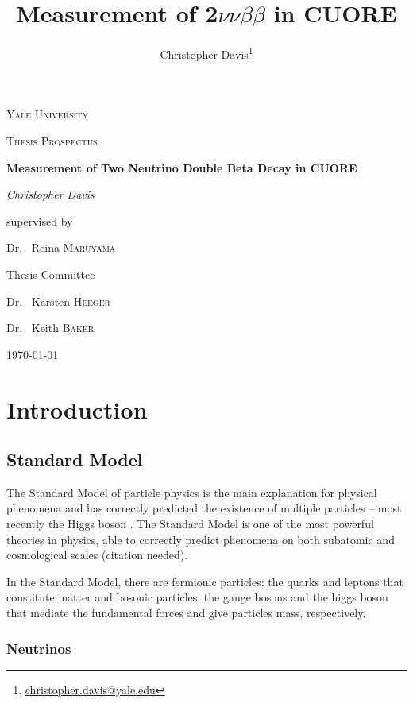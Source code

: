 \documentclass[12pt,a4paper]{article}
\author{Christopher Davis\thanks{\url{christopher.davis@yale.edu}}}
\title{Measurement of 2$\nu\nu\beta\beta$ in CUORE}
\begin{document}
\begin{titlepage}
\centering

{\scshape\LARGE Yale University \par}
\vspace{1 cm}
{\scshape\Large Thesis Prospectus \par}
\vspace{1.5 cm}
{\huge\bfseries Measurement of Two Neutrino Double Beta Decay in CUORE \par}
\vspace{2 cm}
{\Large\itshape Christopher Davis \par}
\vfill
supervised by \par
Dr. ~Reina \textsc{Maruyama}

\vfill
Thesis Committee \par
Dr. ~Karsten \textsc{Heeger} \par
Dr. ~Keith \textsc{Baker}

\vfill
{\large \today \par}
\end{titlepage}

\tableofcontents
\listoffigures

\doublespacing
\linenumbers

\section{Introduction}

\subsection{Standard Model}

The Standard Model of particle physics is the main explanation for physical phenomena and has correctly predicted the existence of multiple particles -- most recently the Higgs boson \cite{Aad:2012tfa}\cite{Chatrchyan:2012xdj}. The Standard Model is one of the most powerful theories in physics, able to correctly predict phenomena on both subatomic and cosmological scales (\color{blue}citation needed\color{black}).

In the Standard Model, there are fermionic particles: the quarks and leptons that constitute matter and bosonic particles: the gauge bosons and the higgs boson that mediate the fundamental forces and give particles mass, respectively. 

\subsubsection*{Neutrinos}
\end{document}

